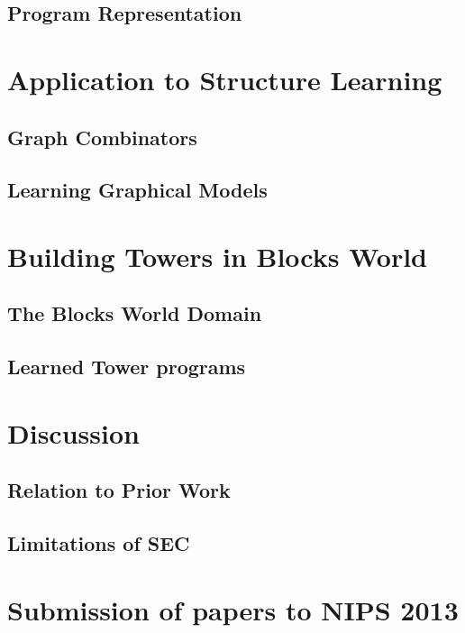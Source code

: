 \documentclass{article} %
\begin{document}
\subsection{Program Representation}

\section{Application to Structure Learning}

\subsection{Graph Combinators}

\subsection{Learning Graphical Models}

\section{Building Towers in Blocks World}

\subsection{The Blocks World Domain}

\subsection{Learned Tower programs}

\section{Discussion}

\subsection{Relation to Prior Work}

\subsection{Limitations of SEC}

\section{Submission of papers to NIPS 2013}
\end{document}

